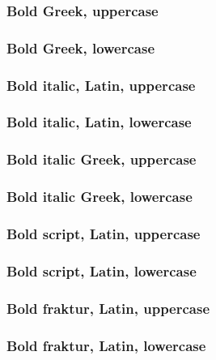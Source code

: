 \documentclass[final]{article}
\newcounter{#1}
\begin{document}
\subsubsection{Bold Greek, uppercase}

\subsubsection{Bold Greek, lowercase}

\subsubsection{Bold italic, Latin, uppercase}

\subsubsection{Bold italic, Latin, lowercase}

\subsubsection{Bold italic Greek, uppercase}

\subsubsection{Bold italic Greek, lowercase}

\subsubsection{Bold script, Latin, uppercase}

\subsubsection{Bold script, Latin, lowercase}

\subsubsection{Bold fraktur, Latin, uppercase}

\subsubsection{Bold fraktur, Latin, lowercase}
\end{document}
